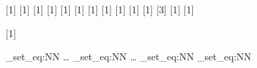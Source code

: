 \newtextcommand{\color}
\newtextcommand{\bgcolor}
\newtextcommand{\displaystyle}
\newtextcommand{\textstyle}
\newtextcommand{\textsize}
\newtextcommand{\scriptsize}
\let\scriptstyle=\scriptsize
\newtextcommand{\scriptscriptsize}
\let\scriptscriptstyle=\scriptscriptsize
\newtextcommand{\mathit}[1]
\newtextcommand{\boldsymbol}
\newtextcommand{\mathbf}[1]
\newtextcommand{\mathrm}[1]
\newtextcommand{\mathbb}[1]
\newtextcommand{\mathfrak}[1]
\newtextcommand{\mathfr}[1]
\newtextcommand{\slash}[1]
\newtextcommand{\boxed}[1]
\newtextcommand{\mathcal}[1]
\newtextcommand{\substack}[1]
\newtextcommand{\arrayopts}[1]
\newtextcommand{\colalign}
\newtextcommand{\collayout}
\newtextcommand{\rowalign}
\newtextcommand{\equalrows}
\newtextcommand{\equalcols}
\newtextcommand{\rowlines}
\newtextcommand{\collines}
\newtextcommand{\frame}
\newtextcommand{\padding}
\newtextcommand{\rowopts}
\newtextcommand{\cellopts}
\newtextcommand{\rowspan}
\newtextcommand{\colspan}
\newtextcommand{\medspace}
\newtextcommand{\thickspace}
\newtextcommand{\negspace}
\newtextcommand{\operatorname}
\newtextcommand{\mathop}
\newtextcommand{\mathbin}
\newtextcommand{\mathrel}
\newtextcommand[\text]{\itextext}
\newtextcommand[\array]{\itexarray}
\newtextcommand[\align]{\itexalign}
\newtextcommand[\space]{\itexspace}[3]
\newtextcommand[]{\itexgroup}[1]
\newtextcommand[\text]{\textrm}[1]
\newtextcommand[\\]{\itexnl}

[1]

\newtextcommand*{\!}
\newtextcommand*{\|}
\newtextcommand*{\:}
\newtextcommand*{\;}
\itexmathscommand{\,}

\cs_set_eq:NN \dotsc \dots
\cs_set_eq:NN \dotsb \dots
\cs_set_eq:NN \land \wedge
\cs_set_eq:NN \lor \vee

\endinput

